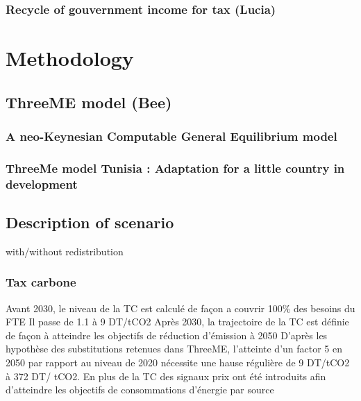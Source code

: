 \documentclass[
]{article}
\begin{document}
\hypertarget{recycle-of-gouvernment-income-for-tax-lucia}{%
\subsubsection{Recycle of gouvernment income for tax
(Lucia)}\label{recycle-of-gouvernment-income-for-tax-lucia}}

\hypertarget{methodology}{%
\section{Methodology}\label{methodology}}

\hypertarget{threeme-model-bee}{%
\subsection{ThreeME model (Bee)}\label{threeme-model-bee}}

\hypertarget{a-neo-keynesian-computable-general-equilibrium-model}{%
\subsubsection{A neo-Keynesian Computable General Equilibrium
model}\label{a-neo-keynesian-computable-general-equilibrium-model}}

\hypertarget{threeme-model-tunisia-adaptation-for-a-little-country-in-development}{%
\subsubsection{ThreeMe model Tunisia : Adaptation for a little country
in
development}\label{threeme-model-tunisia-adaptation-for-a-little-country-in-development}}

\hypertarget{description-of-scenario}{%
\subsection{Description of scenario}\label{description-of-scenario}}

with/without redistribution

\hypertarget{tax-carbone}{%
\subsubsection{Tax carbone}\label{tax-carbone}}

Avant 2030, le niveau de la TC est calculé de façon a couvrir 100\% des
besoins du FTE Il passe de 1.1 à 9 DT/tCO2 Après 2030, la trajectoire de
la TC est définie de façon à atteindre les objectifs de réduction
d'émission à 2050 D'après les hypothèse des substitutions retenues dans
ThreeME, l'atteinte d'un factor 5 en 2050 par rapport au niveau de 2020
nécessite une hause régulière de 9 DT/tCO2 à 372 DT/ tCO2. En plus de la
TC des signaux prix ont été introduits afin d'atteindre les objectifs de
consommations d'énergie par source
\end{document}
